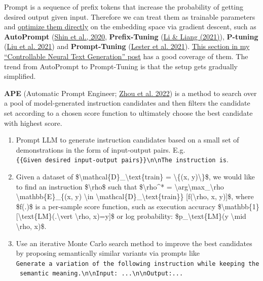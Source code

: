 Prompt is a sequence of prefix tokens that increase the probability of getting desired output given input. Therefore we can treat them as trainable parameters and \href{https://lilianweng.github.io/posts/2021-01-02-controllable-text-generation/\#smart-prompt-design}{optimize them directly} on the embedding space via gradient descent, such as \textbf{AutoPrompt} (\href{https://arxiv.org/abs/2010.15980}{Shin et al., 2020}, \textbf{Prefix-Tuning} (\href{https://arxiv.org/abs/2101.00190}{Li \& Liang (2021)}), \textbf{P-tuning} (\href{https://arxiv.org/abs/2103.10385}{Liu et al. 2021}) and \textbf{Prompt-Tuning} (\href{https://arxiv.org/abs/2104.08691}{Lester et al. 2021}). \href{https://lilianweng.github.io/posts/2021-01-02-controllable-text-generation/\#smart-prompt-design}{This section in my ``Controllable Neural Text Generation'' post} has a good coverage of them. The trend from AutoPrompt to Prompt-Tuning is that the setup gets gradually simplified.

\textbf{APE} (Automatic Prompt Engineer; \href{https://arxiv.org/abs/2211.01910}{Zhou et al. 2022}) is a method to search over a pool of model-generated instruction candidates and then filters the candidate set according to a chosen score function to ultimately choose the best candidate with highest score.

\begin{enumerate}
\item
  Prompt LLM to generate instruction candidates based on a small set of demonstrations in the form of input-output pairs. E.g. \texttt{\{\{Given\ desired\ input-output\ pairs\}\}\textbackslash{}n\textbackslash{}nThe\ instruction\ is}.
\item
  Given a dataset of \$\textbackslash mathcal\{D\}\_\textbackslash text\{train\} = \textbackslash\{(x, y)\textbackslash\}\$, we would like to find an instruction \$\textbackslash rho\$ such that \$\textbackslash rho\^{}* = \textbackslash arg\textbackslash max\_\textbackslash rho \textbackslash mathbb\{E\}\_\{(x, y) \textbackslash in \textbackslash mathcal\{D\}\_\textbackslash text\{train\}\} {[}f(\textbackslash rho, x, y){]}\$, where \$f(.)\$ is a per-sample score function, such as execution accuracy \$\textbackslash mathbb\{1\}{[}\textbackslash text\{LM\}(.\textbackslash vert \textbackslash rho, x)=y{]}\$ or log probability: \$p\_\textbackslash text\{LM\}(y \textbackslash mid \textbackslash rho, x)\$.
\item
  Use an iterative Monte Carlo search method to improve the best candidates by proposing semantically similar variants via prompts like \texttt{Generate\ a\ variation\ of\ the\ following\ instruction\ while\ keeping\ the\ semantic\ meaning.\textbackslash{}n\textbackslash{}nInput:\ ...\textbackslash{}n\textbackslash{}nOutput:...}
\end{enumerate}

